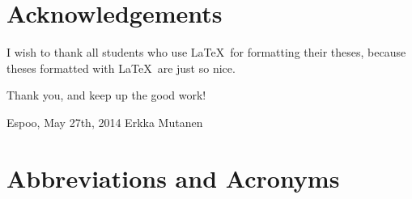 \documentclass[12pt,a4paper,oneside,pdftex]{report}
\newcommand{\DATE}{May 27th, 2014}
\newcommand{\AUTHOR}{Erkka Mutanen}
\begin{document}


\chapter*{Acknowledgements}

I wish to thank all students who use \LaTeX\ for formatting their theses,
because theses formatted with \LaTeX\ are just so nice.

Thank you, and keep up the good work!
\vskip 10mm

\noindent Espoo, \DATE
\vskip 5mm
\noindent\AUTHOR

\cleardoublepage
\tableofcontents

\cleardoublepage
% 

\chapter*{Abbreviations and Acronyms}

\end{document}

